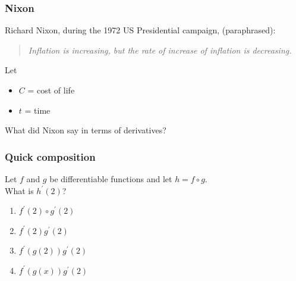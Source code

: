 \documentclass[14pt]{beamer}
\begin{document}

	\begin{frame}
		\frametitle{Nixon}

		Richard Nixon, during the 1972 US Presidential campaign, (paraphrased):

		\begin{quote}
			\emph{Inflation is increasing, but the rate of increase of inflation is decreasing.}
		\end{quote}

		\vfill

		Let
		\begin{itemize}
			\item $C$ = cost of life

			\item $t$ = time
		\end{itemize}
		What did Nixon say in terms of derivatives?

		\vfill
	\end{frame}




	\begin{frame}
		\frametitle{Quick composition}

		Let $f$ and $g$ be differentiable functions and let $h=f\circ g$. \\ What is
		$h^{\prime}(2)$? \begin {enumerate} \item $f^{\prime}(2)\circ g^{\prime}(2)$
		\item $f^{\prime}(2)g^{\prime}(2)$ \item $f^{\prime}(g(2)) g^{\prime}(2)$
		\item $f^{\prime}(g(x)) g^{\prime}(2)$ \end{enumerate}

	\end{frame}

\end{document}

